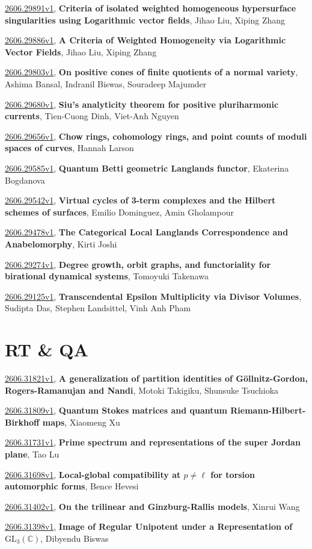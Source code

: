 \documentclass[9pt, a4paper]{article}
\theoremstyle{plain}
\theoremstyle{definition}
\theoremstyle{remark}
\newcommand{\arxiv}[3]{\href{https://arxiv.org/abs/#1}{#1}, \textbf{\textcolor{arxivblue}{#2}}, #3}
\begin{document}
\arxiv{2606.29891v1}{Criteria of isolated weighted homogeneous hypersurface singularities using Logarithmic vector fields}{Jihao Liu, Xiping Zhang}

\arxiv{2606.29886v1}{A Criteria of Weighted Homogeneity via Logarithmic Vector Fields}{Jihao Liu, Xiping Zhang}

\arxiv{2606.29803v1}{On positive cones of finite quotients of a normal variety}{Ashima Bansal, Indranil Biswas, Souradeep Majumder}

\arxiv{2606.29680v1}{Siu's analyticity theorem for positive pluriharmonic currents}{Tien-Cuong Dinh, Viet-Anh Nguyen}

\arxiv{2606.29656v1}{Chow rings, cohomology rings, and point counts of moduli spaces of curves}{Hannah Larson}

\arxiv{2606.29585v1}{Quantum Betti geometric Langlands functor}{Ekaterina Bogdanova}

\arxiv{2606.29542v1}{Virtual cycles of 3-term complexes and the Hilbert schemes of surfaces}{Emilio Dominguez, Amin Gholampour}

\arxiv{2606.29478v1}{The Categorical Local Langlands Correspondence and Anabelomorphy}{Kirti Joshi}

\arxiv{2606.29274v1}{Degree growth, orbit graphs, and functoriality for birational dynamical systems}{Tomoyuki Takenawa}

\arxiv{2606.29125v1}{Transcendental Epsilon Multiplicity via Divisor Volumes}{Sudipta Das, Stephen Landsittel, Vinh Anh Pham}


\section{RT \& QA}
\arxiv{2606.31821v1}{A generalization of partition identities of Göllnitz-Gordon, Rogers-Ramanujan and Nandi}{Motoki Takigiku, Shunsuke Tsuchioka}

\arxiv{2606.31809v1}{Quantum Stokes matrices and quantum Riemann-Hilbert-Birkhoff maps}{Xiaomeng Xu}

\arxiv{2606.31731v1}{Prime spectrum and representations of the super Jordan plane}{Tao Lu}

\arxiv{2606.31698v1}{Local-global compatibility at $p\neq\ell$ for torsion automorphic forms}{Bence Hevesi}

\arxiv{2606.31402v1}{On the trilinear and Ginzburg-Rallis models}{Xinrui Wang}

\arxiv{2606.31398v1}{Image of Regular Unipotent under a Representation of $\mathrm{GL}_3(\mathbb{C})$}{Dibyendu Biswas}
\end{document}
